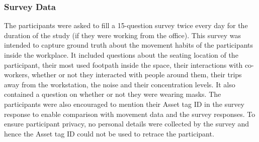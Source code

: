 \documentclass[acmtog]{acmart}
\begin{document}
\subsubsection{Survey Data}
The participants were asked to fill a 15-question survey twice every day for the duration of the study (if they were working from the office). This survey was intended to capture ground truth about the movement habits of the participants inside the workplace. It included questions about the seating location of the participant, their most used footpath inside the space, their interactions with co-workers, whether or not they interacted with people around them, their trips away from the workstation, the noise and their concentration levels. It also contained a question on whether or not they were wearing masks. The participants were also encouraged to mention their Asset tag ID in the survey response to enable comparison with movement data and the survey responses. To ensure participant privacy, no personal details were collected by the survey and hence the Asset tag ID could not be used to retrace the participant.
\end{document}
